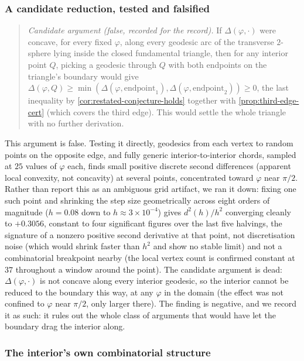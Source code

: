 \documentclass[11pt,reqno]{amsart}
\renewcommand{\_}{\origunderscore\allowbreak}
\numberwithin{equation}{section}
\theoremstyle{plain}
\theoremstyle{definition}
\theoremstyle{remark}
\newcommand{\tilt}{\varphi}                  %
\newcommand{\defect}{\Delta}                 %
\begin{document}
\subsubsection{A candidate reduction, tested and falsified}

\begin{quote}
\emph{Candidate argument (false, recorded for the record).} If
$\defect(\tilt,\cdot)$ were concave, for every fixed $\tilt$, along every
geodesic arc of the transverse $2$-sphere lying inside the closed
fundamental triangle, then for any interior point $Q$, picking a
geodesic through $Q$ with both endpoints on the triangle's boundary
would give $\defect(\tilt,Q)\ge\min(\defect(\tilt,\mathrm{endpoint}_1),
\defect(\tilt,\mathrm{endpoint}_2))\ge0$, the last inequality by
\cref{cor:restated-conjecture-holds} together with
\cref{prop:third-edge-cert} (which covers the third edge). This would
settle the whole triangle with no further derivation.
\end{quote}

This argument is false. Testing it directly, geodesics from each
vertex to random points on the opposite edge, and fully generic interior-to-interior
chords, sampled at $25$ values of $\tilt$ each, finds small positive
discrete second differences (apparent local convexity, not concavity)
at several points, concentrated toward $\tilt$ near $\pi/2$. Rather than
report this as an ambiguous grid artifact, we ran it down: fixing one
such point and shrinking the step size geometrically across eight orders
of magnitude ($h=0.08$ down to $h\approx3\times10^{-4}$) gives
$d^2(h)/h^2$ converging cleanly to $+0.3056$, constant to four
significant figures over the last five halvings, the signature of a
nonzero positive second derivative at that point, not
discretisation noise (which would shrink faster than $h^2$ and show no
stable limit) and not a combinatorial breakpoint nearby (the local
vertex count is confirmed constant at $37$ throughout a window around
the point). The candidate argument is dead: $\defect(\tilt,\cdot)$ is
not concave along every interior geodesic, so the interior cannot be
reduced to the boundary this way, at any $\tilt$ in the domain (the
effect was not confined to $\tilt$ near $\pi/2$, only larger there).
The finding is negative, and we record it as such: it rules out the
whole class of arguments that would have let the boundary drag the
interior along.

\subsubsection{The interior's own combinatorial structure}
\end{document}
